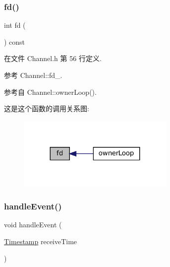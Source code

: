 \mbox{\label{classmuduo_1_1net_1_1Channel_ace5c4071ee8893901bb818bbcab739b2}} 
\subsubsection{\texorpdfstring{fd()}{fd()}}
{\footnotesize\ttfamily int fd (\begin{DoxyParamCaption}{ }\end{DoxyParamCaption}) const\hspace{0.3cm}{\ttfamily [inline]}}



在文件 Channel.\+h 第 56 行定义.



参考 Channel\+::fd\+\_\+.



参考自 Channel\+::owner\+Loop().

这是这个函数的调用关系图\+:
\nopagebreak
\begin{figure}[H]
\begin{center}
\leavevmode
\includegraphics[width=215pt]{classmuduo_1_1net_1_1Channel_ace5c4071ee8893901bb818bbcab739b2_icgraph}
\end{center}
\end{figure}
\mbox{\label{classmuduo_1_1net_1_1Channel_af59cb7c3df275e78794f431792feb4f1}} 
\subsubsection{\texorpdfstring{handle\+Event()}{handleEvent()}}
{\footnotesize\ttfamily void handle\+Event (\begin{DoxyParamCaption}\item[{\hyperlink{classmuduo_1_1Timestamp}{Timestamp}}]{receive\+Time }\end{DoxyParamCaption})}

